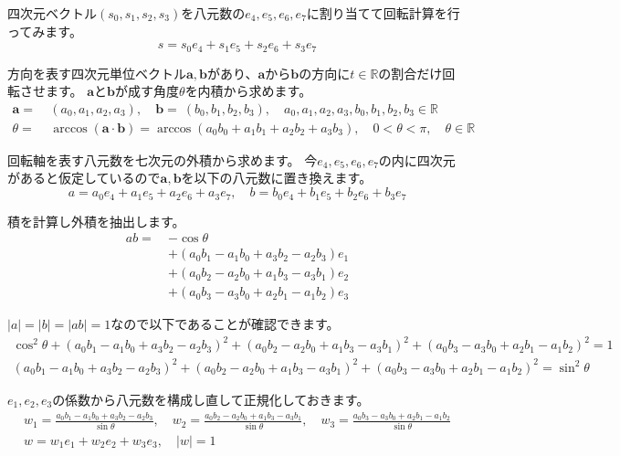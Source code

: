 \documentclass[a4paper,12pt,notitlepage]{jsreport}
\begin{document}
四次元ベクトル$(s_0,s_1,s_2,s_3)$を八元数の$e_4,e_5,e_6,e_7$に割り当てて回転計算を行ってみます。
\begin{equation}
  s=s_0e_4+s_1e_5+s_2e_6+s_3e_7
\end{equation}

方向を表す四次元単位ベクトル$\bm{a},\bm{b}$があり、$\bm{a}$から$\bm{b}$の方向に$t\in\mathbb{R}$の割合だけ回転させます。
$\bm{a}$と$\bm{b}$が成す角度$\theta$を内積から求めます。
\begin{equation}
  \begin{split}
    \bm{a}=~&(a_0,a_1,a_2,a_3),\quad \bm{b}=~(b_0,b_1,b_2,b_3),\quad a_0,a_1,a_2,a_3,b_0,b_1,b_2,b_3\in\mathbb{R}\\
    \theta=~&\arccos(\bm{a}\cdot\bm{b})=\arccos(a_0b_0+a_1b_1+a_2b_2+a_3b_3),\quad 0<\theta<\pi,\quad \theta\in\mathbb{R}
  \end{split}
\end{equation}

回転軸を表す八元数を七次元の外積から求めます。
今$e_4,e_5,e_6,e_7$の内に四次元があると仮定しているので$\bm{a},\bm{b}$を以下の八元数に置き換えます。
\begin{equation}
  a=a_0e_4+a_1e_5+a_2e_6+a_3e_7,\quad b=b_0e_4+b_1e_5+b_2e_6+b_3e_7
\end{equation}

積を計算し外積を抽出します。
\begin{equation}
  \begin{split}
    ab=~&-\cos\theta\\
    &+(a_0b_1-a_1b_0+a_3b_2-a_2b_3)e_1\\
    &+(a_0b_2-a_2b_0+a_1b_3-a_3b_1)e_2\\
    &+(a_0b_3-a_3b_0+a_2b_1-a_1b_2)e_3
  \end{split}
\end{equation}

$|a|=|b|=|ab|=1$なので以下であることが確認できます。
\begin{equation}
  \begin{split}
    \cos^2\theta+(a_0b_1-a_1b_0+a_3b_2-a_2b_3)^2+(a_0b_2-a_2b_0+a_1b_3-a_3b_1)^2+(a_0b_3-a_3b_0+a_2b_1-a_1b_2)^2=1\\
    (a_0b_1-a_1b_0+a_3b_2-a_2b_3)^2+(a_0b_2-a_2b_0+a_1b_3-a_3b_1)^2+(a_0b_3-a_3b_0+a_2b_1-a_1b_2)^2=\sin^2\theta
  \end{split}
\end{equation}

$e_1,e_2,e_3$の係数から八元数を構成し直して正規化しておきます。
\begin{gather}
  w_1=\frac{a_0b_1-a_1b_0+a_3b_2-a_2b_3}{\sin\theta},\quad
  w_2=\frac{a_0b_2-a_2b_0+a_1b_3-a_3b_1}{\sin\theta},\quad
  w_3=\frac{a_0b_3-a_3b_0+a_2b_1-a_1b_2}{\sin\theta}\\
  w=w_1e_1+w_2e_2+w_3e_3,\quad |w|=1
\end{gather}
\end{document}
